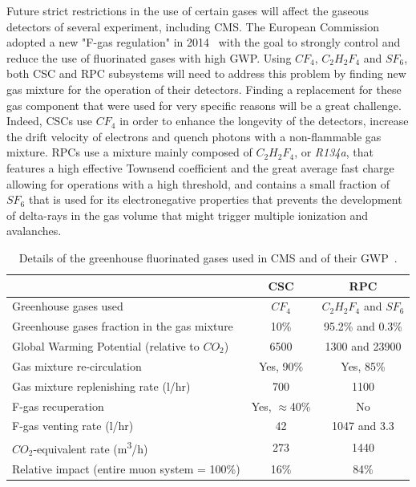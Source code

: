 	Future strict restrictions in the use of certain gases will affect the gaseous detectors of several experiment, including CMS. The European Commission adopted a new "F-gas regulation" in 2014~\cite{EUFGAS2014} with the goal to strongly control and reduce the use of fluorinated gases with high \acf{GWP}. Using $CF_4$, $C_2H_2F_4$ and $SF_6$, both CSC and RPC subsystems will need to address this problem by finding new gas mixture for the operation of their detectors. Finding a replacement for these gas component that were used for very specific reasons will be a great challenge. Indeed, CSCs use $CF_4$ in order to enhance the longevity of the detectors, increase the drift velocity of electrons and quench photons with a non-flammable gas mixture. RPCs use a mixture mainly composed of $C_2H_2F_4$, or \textit{R134a}, that features a high effective Townsend coefficient and the great average fast charge allowing for operations with a high threshold, and contains a small fraction of $SF_6$ that is used for its electronegative properties that prevents the development of delta-rays in the gas volume that might trigger multiple ionization and avalanches.
	
	\begin{table}[H]
		\centering
		\begin{tabular}{l c c}
			\hline
			 & CSC & RPC\\
			\hline
			Greenhouse gases used & $CF_4$ & $C_2H_2F_4$ and $SF_6$ \\
			Greenhouse gases fraction in the gas mixture & 10\% & 95.2\% and 0.3\% \\
			Global Warming Potential (relative to $CO_2$) & 6500 & 1300 and 23900 \\
			Gas mixture re-circulation & Yes, 90\% & Yes, 85\% \\
			Gas mixture replenishing rate (\si{l/hr}) & 700 & 1100 \\
			F-gas recuperation & Yes, $\approx$40\% & No \\
			F-gas venting rate (\si{l/hr}) & 42 & 1047 and 3.3 \\
			$CO_2$-equivalent rate (\si{m^3/h}) & 273 & 1440 \\
			Relative impact (entire muon system = 100\%) & 16\% & 84\% \\
			\hline
		\end{tabular}
		\caption{\label{tab:F-GAS-CMS} Details of the greenhouse fluorinated gases used in CMS and of their GWP~\cite{PHASEIITP}.}
	\end{table}
	
